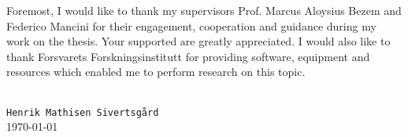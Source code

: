 \begin{acknowledgments}
  Foremost, I would like to thank my supervisors Prof. Marcus Aloysius Bezem and Federico Mancini for their engagement, cooperation and guidance during my work on the thesis. Your supported are greatly appreciated. I would also like to thank Forsvarets Forskningsinstitutt for providing software, equipment and resources which enabled me to perform research on this topic.
  \begin{flushright}
    \mbox{}\\[0.5cm]
    \texttt{Henrik Mathisen Sivertsgård}\\
    \today
  \end{flushright}
\end{acknowledgments}
